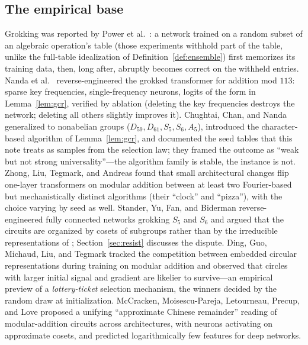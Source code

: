 \documentclass[11pt]{amsart}
\theoremstyle{plain}
\theoremstyle{definition}
\begin{document}
\subsection*{The empirical base}
Grokking was reported by Power et al.~\cite{power2022}: a network trained on a random subset of an algebraic operation's table (those experiments withhold part of the table, unlike the full-table idealization of Definition~\ref{def:ensemble}) first memorizes its training data, then, long after, abruptly becomes correct on the withheld entries. Nanda et al.~\cite{nanda2023} reverse-engineered the grokked transformer for addition mod $113$: sparse key frequencies, single-frequency neurons, logits of the form in Lemma~\ref{lem:gcr}, verified by ablation (deleting the key frequencies destroys the network; deleting all others slightly improves it). Chughtai, Chan, and Nanda \cite{chughtai2023} generalized to nonabelian groups ($D_{59}, D_{61}, S_5, S_6, A_5$), introduced the character-based algorithm of Lemma~\ref{lem:gcr}, and documented the seed tables that this note treats as samples from the selection law; they framed the outcome as ``weak but not strong universality''---the algorithm family is stable, the instance is not. Zhong, Liu, Tegmark, and Andreas \cite{zhong2023} found that small architectural changes flip one-layer transformers on modular addition between at least two Fourier-based but mechanistically distinct algorithms (their ``clock'' and ``pizza''), with the choice varying by seed as well. Stander, Yu, Fan, and Biderman \cite{stander2024} reverse-engineered fully connected networks grokking $S_5$ and $S_6$ and argued that the circuits are organized by cosets of subgroups rather than by the irreducible representations of \cite{chughtai2023}; Section~\ref{sec:resist} discusses the dispute. Ding, Guo, Michaud, Liu, and Tegmark \cite{ding2024} tracked the competition between embedded circular representations during training on modular addition and observed that circles with larger initial signal and gradient are likelier to survive---an empirical preview of a \emph{lottery-ticket} selection mechanism, the winners decided by the random draw at initialization. McCracken, Moisescu-Pareja, Letourneau, Precup, and Love \cite{mccracken2025} proposed a unifying ``approximate Chinese remainder'' reading of modular-addition circuits across architectures, with neurons activating on approximate cosets, and predicted logarithmically few features for deep networks.
\end{document}
